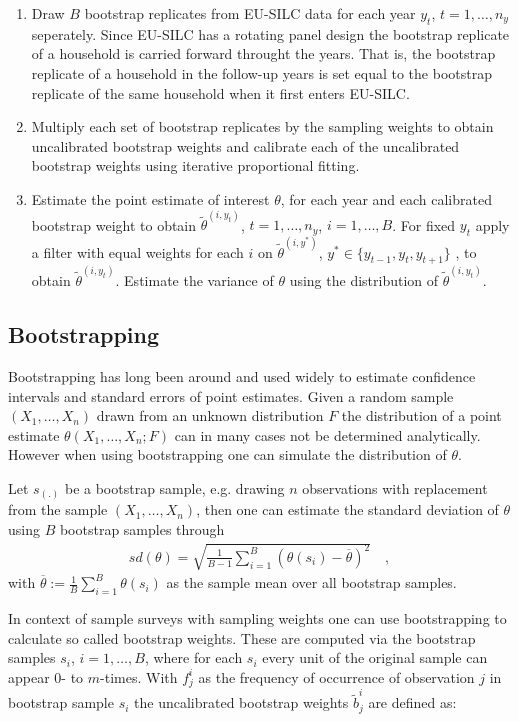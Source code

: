 \documentclass{scrartcl}
\begin{document}
\begin{enumerate}
\item Draw $B$ bootstrap replicates from EU-SILC data for each year $y_t$, $t=1,\ldots,n_y$ seperately. Since EU-SILC has a rotating panel design the bootstrap replicate of a household is carried forward throught the years. That is, the bootstrap replicate of a household in the follow-up years is set equal to the bootstrap replicate of the same household when it first enters EU-SILC.
\item Multiply each set of bootstrap replicates by the sampling weights to obtain uncalibrated bootstrap weights and calibrate each of the uncalibrated bootstrap weights using iterative proportional fitting.
\item Estimate the point estimate of interest $\theta$, for each year and each calibrated bootstrap weight to obtain $\tilde{\theta}^{(i,y_t)}$, $t=1,\ldots,n_y$, $i=1,\ldots,B$. For fixed $y_t$ apply a filter with equal weights for each $i$ on $\tilde{\theta}^{(i,y^*)}$, $y^*\in \{y_{t-1},y_{t},y_{t+1}\}$ , to obtain $\tilde{\theta}^{(i,y_t)}$. Estimate the variance of $\theta$ using the distribution of $\tilde{\theta}^{(i,y_t)}$.
\end{enumerate}

\subsection{Bootstrapping}
Bootstrapping has long been around and used widely to estimate confidence intervals and standard errors of point estimates.\citep{efron1979}
Given a random sample $(X_1,\ldots,X_n)$ drawn from an unknown distribution $F$ the distribution of a point estimate $\theta(X_1,\ldots,X_n;F)$ can in many cases not be determined analytically. However when using bootstrapping one can simulate the distribution of $\theta$.

Let $s_{(.)}$ be a bootstrap sample, e.g. drawing $n$ observations with replacement from the sample $(X_1,\ldots,X_n)$, then one can estimate the standard deviation of $\theta$  using $B$ bootstrap samples through
\begin{align*}
  sd(\theta) = \sqrt{\frac{1}{B-1}\sum\limits_{i=1}^B (\theta(s_i)-\overline{\theta})^2} \quad,
\end{align*}
with $\overline{\theta}:=\frac{1}{B}\sum\limits_{i=1}^B\theta(s_i)$ as the sample mean over all bootstrap samples.

In context of sample surveys with sampling weights one can use bootstrapping to calculate so called bootstrap weights. These are computed via the bootstrap samples $s_{i}$, $i=1,\ldots,B$, where for each $s_{i}$ every unit of the original sample can appear $0$- to $m$-times. With $f_j^{i}$ as the frequency of occurrence of observation $j$ in bootstrap sample $s_i$ the uncalibrated bootstrap weights $\tilde{b}_{j}^{i}$ are defined as:
\end{document}
